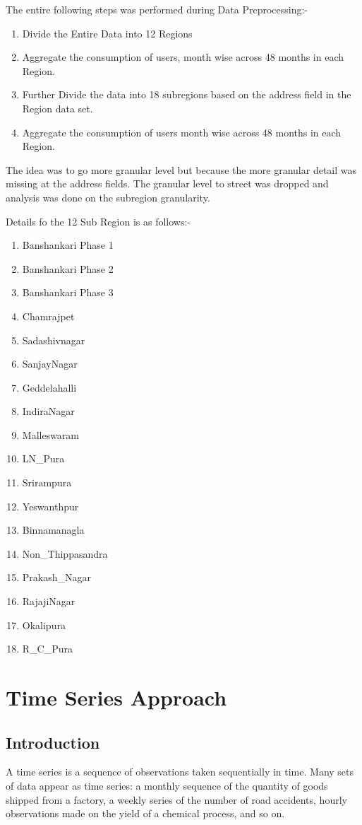 \documentclass[12pt]{iiscthes}
\begin{document}
  The entire following steps was performed during Data Preprocessing:-
  \begin{enumerate}
  	\item Divide the Entire Data into 12 Regions 
  	\item Aggregate the consumption of users, month wise across 48 months in each Region.
  	\item Further Divide the data into 18 subregions based on the address field in the Region data set.
  	\item Aggregate the consumption of users month wise across 48 months in each Region.
  \end{enumerate}
  The idea was to go more granular level but because the more granular detail was missing at the address fields.
  The granular level to street was dropped and analysis was done on the subregion granularity.
  
  Details fo the 12 Sub Region is as follows:-
  \begin{enumerate}
  	\item Banshankari Phase 1
  	\item Banshankari Phase 2
  	\item Banshankari Phase 3
  	\item Chamrajpet
  	\item Sadashivnagar
  	\item SanjayNagar
  	\item Geddelahalli
  	\item IndiraNagar
    \item Malleswaram
  	\item LN\_Pura
  	\item Srirampura
  	\item Yeswanthpur 
  	\item Binnamanagla
  	\item Non\_Thippasandra
  	\item Prakash\_Nagar
  	\item RajajiNagar
  	\item Okalipura
  	\item R\_C\_Pura
  \end{enumerate}
     
\chapter{Time Series Approach}

\section{Introduction}
A time series is a sequence of observations taken sequentially in time. Many sets
of data appear as time series: a monthly sequence of the quantity of goods shipped
from a factory, a weekly series of the number of road accidents, hourly observations made on the yield of a chemical process, and so on.
\end{document}
